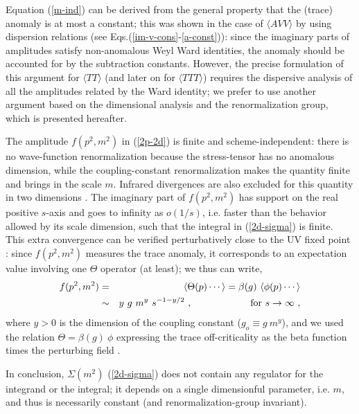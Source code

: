 \documentclass[11pt]{article}
\newcommand{\bea}{\begin{eqnarray}}
\newcommand{\eea}{\end{eqnarray}}
\def\nl{\nonumber\\}
\def\TTT{\bra TTT\ket}
\def\bra{\langle}
\def\ket{\rangle}
\begin{document}
Equation (\ref{m-ind}) can be derived from the general property 
that the (trace) anomaly is at most a constant; this was shown in the case
of $\bra AVV \ket$ by using dispersion relations
(see Eqs.(\ref{im-v-cons}-\ref{a-const})): since the imaginary parts of
amplitudes satisfy non-anomalous Weyl Ward identities, the
anomaly should be accounted for by the subtraction constants.
However, the precise formulation of this argument for $\bra TT\ket$
(and later on for $\TTT$) requires the dispersive analysis of all
the amplitudes related by the Ward identity; we prefer to use another
argument based on the dimensional analysis and the renormalization group,
which is presented hereafter.

The amplitude $f(p^2,m^2)$ in (\ref{2p-2d}) is finite and scheme-independent:
there is no wave-function
renormalization because the stress-tensor has no anomalous dimension,
while the coupling-constant renormalization makes the quantity finite
and brings in the scale $m$.
Infrared divergences are also excluded for this quantity in two
dimensions \cite{cfl}.
The imaginary part of $f(p^2,m^2)$ has support on the real positive $s$-axis
and goes to infinity as $o(1/s)$, i.e. faster than the behavior allowed by
its scale dimension, such that the integral in (\ref{2d-sigma}) is finite.
This extra convergence can be verified perturbatively close to the
UV fixed point \cite{cth}\cite{cfl}: 
since $f(p^2,m^2)$ measures the trace anomaly,
it corresponds to an expectation value involving
one $\Theta$ operator (at least); we thus can write,
\bea
f(p^2,m^2) & =& \bra \Theta(p) \cdots \ket 
= \beta(g)\ \bra \phi(p) \cdots \ket \nl
& \sim &
y \ g\ m^y\ s^{-1-y/2}\ ,\qquad\qquad\qquad {\rm for} \ s\to\infty\ ,
\label{large-s}
\eea
where $y >0$ is the dimension of the coupling constant 
($g_o\equiv g\ m^y$), and we used
the relation $\Theta=\beta (g)\ \phi$ expressing the trace off-criticality
as the beta function times the perturbing field \cite{polch}.

In conclusion, $\Sigma(m^2)$ (\ref{2d-sigma}) 
does not contain any regulator for the integrand or the integral;
it depends on a single dimensionful parameter, i.e. $m$,
and thus is necessarily constant (and renormalization-group invariant).
\end{document}

